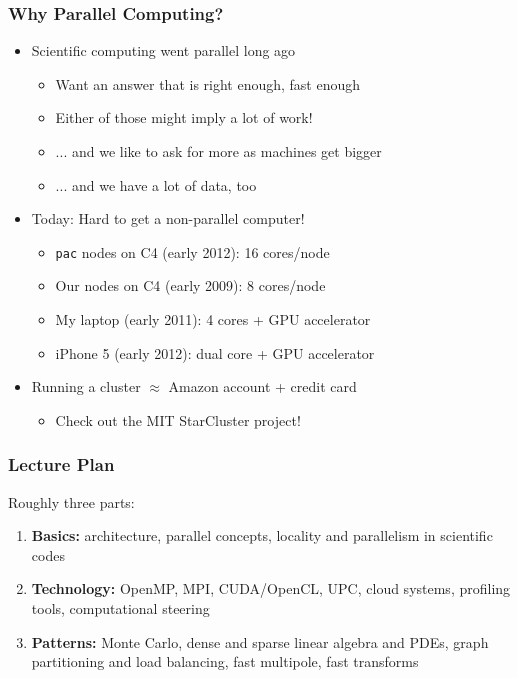 \documentclass{beamer}
\begin{document}
\begin{frame}
  \frametitle{Why Parallel Computing?}

  \begin{itemize}
  \item Scientific computing went parallel long ago
    \begin{itemize}
    \item Want an answer that is right enough, fast enough
    \item Either of those might imply a lot of work!
    \item ... and we like to ask for more as machines get bigger
    \item ... and we have a lot of data, too
    \end{itemize}
  \item Today: Hard to get a non-parallel computer!
    \begin{itemize}
    \item {\tt pac} nodes on C4 (early 2012): 16 cores/node
    \item Our nodes on C4 (early 2009): 8 cores/node
    \item My laptop (early 2011): 4 cores + GPU accelerator
    \item iPhone 5 (early 2012): dual core + GPU accelerator 
    \end{itemize}
  \item Running a cluster $\approx$ Amazon account + credit card
    \begin{itemize}
    \item Check out the MIT StarCluster project!
    \end{itemize}
  \end{itemize}

\end{frame}


\begin{frame}
  \frametitle{Lecture Plan}

  Roughly three parts:
  \begin{enumerate}
  \item {\bf Basics:} architecture, parallel concepts, 
    locality and parallelism in scientific codes
  \item {\bf Technology:} OpenMP, MPI, CUDA/OpenCL, UPC, cloud systems,
    profiling tools, computational steering
  \item {\bf Patterns:} Monte Carlo, dense and sparse linear algebra and PDEs,
    graph partitioning and load balancing, fast multipole, fast transforms
  \end{enumerate}
\end{frame}
\end{document}
